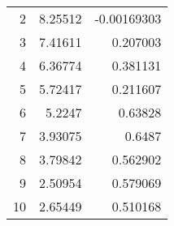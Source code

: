 \begin{tabular}{rrr}
    2 & 8.25512 & -0.00169303 \\
    3 & 7.41611 & 0.207003 \\
    4 & 6.36774 & 0.381131 \\
    5 & 5.72417 & 0.211607 \\
    6 & 5.2247 & 0.63828 \\
    7 & 3.93075 & 0.6487 \\
    8 & 3.79842 & 0.562902 \\
    9 & 2.50954 & 0.579069 \\
    10 & 2.65449 & 0.510168 \\
\end{tabular}
